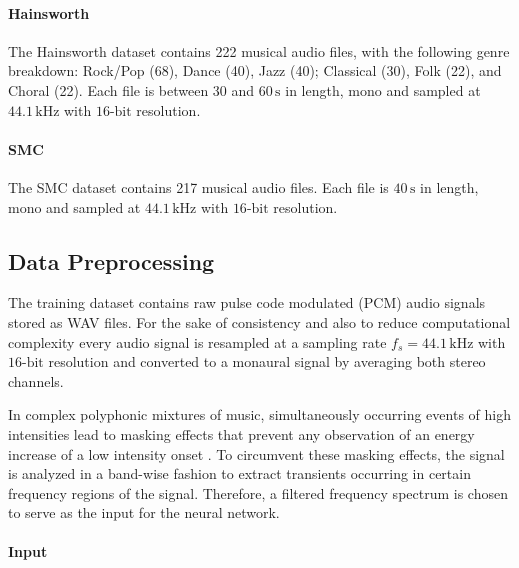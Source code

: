 \documentclass{scrartcl}
\begin{document}
\paragraph{Hainsworth} 
The Hainsworth dataset \cite{Hainsworth2004} contains 222 musical audio files, with the following genre breakdown: Rock/Pop (68), Dance (40), Jazz (40); Classical (30), Folk (22), and Choral (22). Each file is between $30$ and $60\,\text{s}$ in length, mono and sampled at $44.1\,\text{kHz}$ with $16\text{-bit}$ resolution.

\paragraph{SMC}
The SMC dataset \cite{Holzapfel2012} contains 217 musical audio files. Each file is $40 \,\text{s}$ in length, mono and sampled at $44.1\,\text{kHz}$ with $16\text{-bit}$ resolution.


\subsection{Data Preprocessing}

The training dataset contains raw pulse code modulated (PCM) audio signals stored as WAV files. For the sake of consistency and also to reduce computational complexity every audio signal is resampled at a sampling rate $f_s = 44.1 \,\text{kHz}$ with $16\text{-bit}$ resolution and converted to a monaural signal by averaging both stereo channels. 

In complex polyphonic mixtures of music, simultaneously occurring events of high intensities lead to masking effects that prevent any observation of an energy increase of a low intensity onset \cite{Grosche2010}. To circumvent these masking effects, the signal is analyzed in a band-wise fashion to extract transients occurring in certain frequency regions of the signal. Therefore, a filtered frequency spectrum is chosen to serve as the input for the neural network.


\paragraph{Input}
\end{document}
